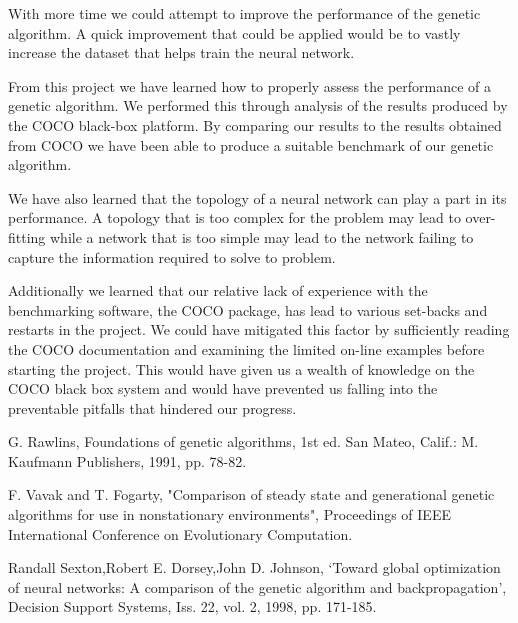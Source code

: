 \documentclass[12pt]{article}
\begin{document}
With more time we could attempt to improve the performance of the genetic algorithm. A quick improvement that could be applied would be to vastly increase the dataset that helps train the neural network.

From this project we have learned how to properly assess the performance of a genetic algorithm. We performed this through analysis of the results produced by the COCO black-box platform. By comparing our results to the results obtained from COCO we have been able to produce a suitable benchmark of our genetic algorithm.

We have also learned that the topology of a neural network can play a part in its performance. A topology that is too complex for the problem may lead to over-fitting while a network that is too simple may lead to the network failing to capture the information required to solve to problem.

Additionally we learned that our relative lack of experience with the benchmarking software, the COCO package, has lead to various set-backs and restarts in the project. We could have mitigated this factor by sufficiently reading the COCO documentation and examining the limited on-line examples before starting the project. This would have given us a wealth of knowledge on the COCO black box system and would have prevented us falling into the preventable pitfalls that hindered our progress.


\newpage
\begin{thebibliography}{9}
G. Rawlins, Foundations of genetic algorithms, 1st ed. San Mateo, Calif.: M. Kaufmann Publishers, 1991, pp. 78-82.

F. Vavak and T. Fogarty, "Comparison of steady state and generational genetic algorithms for use in nonstationary environments", Proceedings of IEEE International Conference on Evolutionary Computation.

Randall Sexton,Robert E. Dorsey,John D. Johnson, ‘Toward global optimization of neural networks: A comparison of the genetic algorithm and backpropagation’, Decision Support Systems, Iss. 22, vol. 2, 1998, pp. 171-185.
\end{thebibliography}
\end{document}
